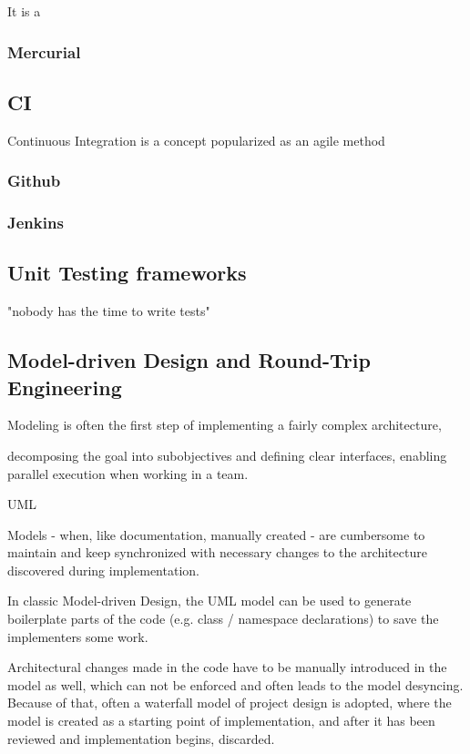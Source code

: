 It is a  
\subsubsection{Mercurial}

\subsection{CI}
Continuous Integration is a concept popularized as an \gls{agile} method
\subsubsection{Github}

\subsubsection{Jenkins}


\subsection{Unit Testing frameworks}

"nobody has the time to write tests"

\subsection{Model-driven Design and Round-Trip Engineering}
Modeling is often the first step of implementing a fairly complex architecture, 

decomposing the goal into subobjectives and defining clear interfaces, enabling parallel execution when working in a team.

UML

Models - when, like documentation, manually created - are cumbersome to maintain and keep synchronized with necessary changes to the architecture discovered during implementation.

In classic Model-driven Design, the UML model can be used to generate boilerplate parts of the code (e.g. class / namespace declarations) to save the implementers some work.

Architectural changes made in the code have to be manually introduced in the model as well, which can not be enforced and often leads to the model desyncing. Because of that, often a waterfall model of project design is adopted, where the model is created as a starting point of implementation, and after it has been reviewed and implementation begins, discarded.

